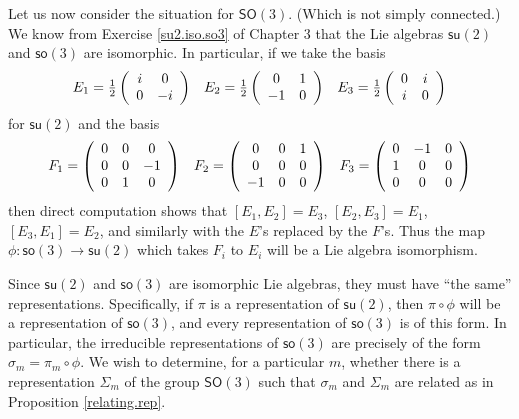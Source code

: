 \documentclass{amsbook}
\theoremstyle{plain}
\numberwithin{equation}{chapter}
\numberwithin{theorem}{chapter}
\begin{document}
Let us now consider the situation for $\mathsf{SO}(3)$. (Which is not simply
connected.) We know from Exercise \ref{su2.iso.so3} of Chapter 3 that the Lie
algebras $\mathsf{su}(2)$ and $\mathsf{so}(3)$ are isomorphic. In particular,
if we take the basis
\[%
\begin{array}
[c]{ccc}%
E_{1}=\tfrac12\left(
\begin{array}
[c]{cc}%
i & 0\\
0 & -i
\end{array}
\right)  & E_{2}=\tfrac12\left(
\begin{array}
[c]{cc}%
0 & 1\\
-1 & 0
\end{array}
\right)  & E_{3}=\tfrac12\left(
\begin{array}
[c]{cc}%
0 & i\\
i & 0
\end{array}
\right)
\end{array}
\]
for $\mathsf{su}(2)$ and the basis
\[%
\begin{array}
[c]{ccc}%
F_{1}=\left(
\begin{array}
[c]{ccc}%
0 & 0 & 0\\
0 & 0 & -1\\
0 & 1 & 0
\end{array}
\right)  & F_{2}=\left(
\begin{array}
[c]{ccc}%
0 & 0 & 1\\
0 & 0 & 0\\
-1 & 0 & 0
\end{array}
\right)  & F_{3}=\left(
\begin{array}
[c]{ccc}%
0 & -1 & 0\\
1 & 0 & 0\\
0 & 0 & 0
\end{array}
\right)
\end{array}
\]
then direct computation shows that $\left[  E_{1},E_{2}\right]  =E_{3}$,
$\left[  E_{2},E_{3}\right]  =E_{1}$, $\left[  E_{3},E_{1}\right]  =E_{2}$,
and similarly with the $E $'s replaced by the $F$'s. Thus the map
$\phi:\mathsf{so}(3)\rightarrow\mathsf{su}(2)$ which takes $F_{i}$ to $E_{i}$
will be a Lie algebra isomorphism.

Since $\mathsf{su}(2)$ and $\mathsf{so}(3)$ are isomorphic Lie algebras, they
must have ``the same'' representations. Specifically, if $\pi$ is a
representation of $\mathsf{su}(2)$, then $\pi\circ\phi$ will be a
representation of $\mathsf{so}(3)$, and every representation of $\mathsf{so}%
(3)$ is of this form. In particular, the irreducible representations of
$\mathsf{so}(3)$ are precisely of the form $\sigma_{m}=\pi_{m}\circ\phi$. We
wish to determine, for a particular $m$, whether there is a representation
$\Sigma_{m} $ of the group $\mathsf{SO}(3)$ such that $\sigma_{m}$ and
$\Sigma_{m}$ are related as in Proposition \ref{relating.rep}.
\end{document}
